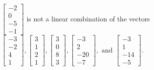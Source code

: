 \begin{exercise}
\begin{exerciseStatement}
  \end{exerciseStatement}
  \begin{exerciseAnswer}
   \(\left[\begin{array}{c}
-2 \\
0 \\
-5 \\
-1
\end{array}\right]\) 
  	 is not  
	a linear combination of the vectors \(\left[\begin{array}{c}
-3 \\
-2 \\
4 \\
1
\end{array}\right] , \left[\begin{array}{c}
3 \\
1 \\
2 \\
1
\end{array}\right] , \left[\begin{array}{c}
3 \\
0 \\
8 \\
3
\end{array}\right] , \left[\begin{array}{c}
-3 \\
2 \\
-20 \\
-7
\end{array}\right] , \text{ and } \left[\begin{array}{c}
-3 \\
1 \\
-14 \\
-5
\end{array}\right]\).

	
  


  \end{exerciseAnswer}
\end{exercise}